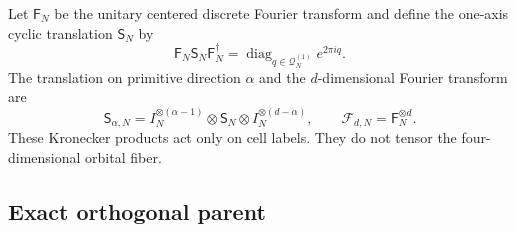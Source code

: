 \documentclass[11pt]{article}
\begin{document}
Let $\mathsf F_N$ be the unitary centered discrete Fourier transform and define the
one-axis cyclic translation $\mathsf S_N$ by
\begin{equation}
 \mathsf F_N\mathsf S_N\mathsf F_N^\dagger
 =\operatorname{diag}_{q\in\mathcal Q_N^{(1)}}e^{2\pi iq}.
 \label{eq:one-axis-translation}
\end{equation}
The translation on primitive direction $\alpha$ and the $d$-dimensional Fourier
transform are
\begin{equation}
 \mathsf S_{\alpha,N}
 =I_N^{\otimes(\alpha-1)}\otimes\mathsf S_N
  \otimes I_N^{\otimes(d-\alpha)},
 \qquad
 \mathcal F_{d,N}=\mathsf F_N^{\otimes d}.
 \label{eq:tensor-translation-fourier}
\end{equation}
These Kronecker products act only on cell labels. They do not tensor the
four-dimensional orbital fiber.

\subsection{Exact orthogonal parent}
\end{document}
